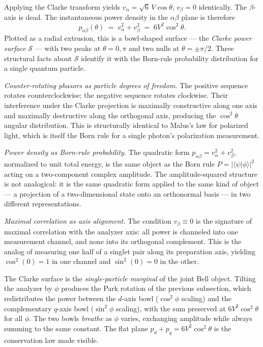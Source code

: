 \documentclass[
  11pt]{article}
\begin{document}
Applying the Clarke transform yields
\(v_\alpha = \sqrt{6}\,V\cos\theta\), \(v_\beta = 0\) identically. The
\(\beta\)-axis is dead. The instantaneous power density in the
\(\alpha\beta\) plane is therefore \[
p_{\alpha\beta}(\theta) \;=\; v_\alpha^2 + v_\beta^2 \;=\; 6V^2\cos^2\theta.
\] Plotted as a radial extrusion, this is a bowl-shaped surface --- the
\emph{Clarke power surface} \(\mathcal{S}\) --- with two peaks at
\(\theta = 0, \pi\) and two nulls at \(\theta = \pm \pi/2\). Three
structural facts about \(\mathcal{S}\) identify it with the Born-rule
probability distribution for a single quantum particle.

\emph{Counter-rotating phasors as particle degrees of freedom.} The
positive sequence rotates counterclockwise; the negative sequence
rotates clockwise. Their interference under the Clarke projection is
maximally constructive along one axis and maximally destructive along
the orthogonal axis, producing the \(\cos^2\theta\) angular
distribution. This is structurally identical to Malus's law for
polarized light, which is itself the Born rule for a single photon's
polarization measurement.

\emph{Power density as Born-rule probability.} The quadratic form
\(p_{\alpha\beta} = v_\alpha^2 + v_\beta^2\), normalized to unit total
energy, is the same object as the Born rule
\(P = |\langle\psi|\phi\rangle|^2\) acting on a two-component complex
amplitude. The amplitude-squared structure is not analogical: it is the
same quadratic form applied to the same kind of object --- a projection
of a two-dimensional state onto an orthonormal basis --- in two
different representations.

\emph{Maximal correlation as axis alignment.} The condition
\(v_\beta \equiv 0\) is the signature of maximal correlation with the
analyzer axis: all power is channeled into one measurement channel, and
none into its orthogonal complement. This is the analog of measuring one
half of a singlet pair along its preparation axis, yielding
\(\cos^2(0) = 1\) in one channel and \(\sin^2(0) = 0\) in the other.

The Clarke surface is the \emph{single-particle marginal} of the joint
Bell object. Tilting the analyzer by \(\phi\) produces the Park rotation
of the previous subsection, which redistributes the power between the
\(d\)-axis bowl (\(\cos^2\phi\) scaling) and the complementary
\(q\)-axis bowl (\(\sin^2\phi\) scaling), with the sum preserved at
\(6V^2\cos^2\theta\) for all \(\phi\). The two bowls \emph{breathe} as
\(\phi\) varies, exchanging amplitude while always summing to the same
constant. The flat plane \(p_d + p_q = 6V^2\cos^2\theta\) is the
conservation law made visible.
\end{document}
